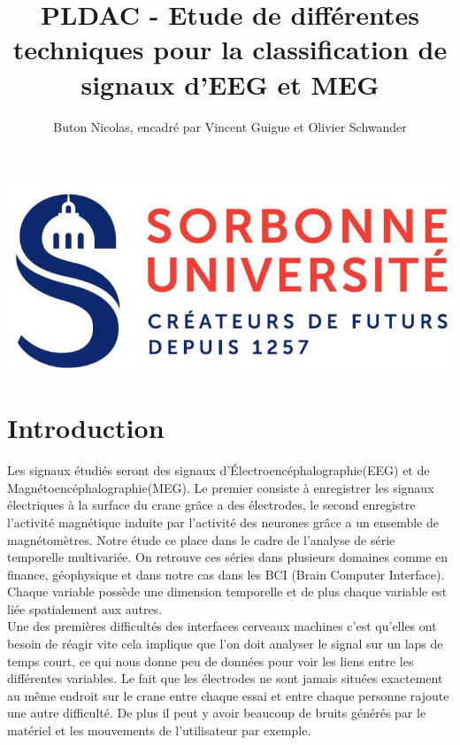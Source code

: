 \documentclass{article}[12pt]
\title{PLDAC - Etude de différentes techniques pour la classification de signaux d'EEG et MEG}
\author{Buton Nicolas, encadré par Vincent Guigue et Olivier Schwander}
\begin{document}
\maketitle
\begin{center}
\includegraphics[scale=1]{images/logoSorbonne.jpg}
\end{center}
\newpage
\tableofcontents
\newpage
{}
\part{Introduction}
Les signaux étudiés seront des signaux d'Électroencéphalographie(EEG) et de Magnétoencéphalographie(MEG). Le premier consiste à enregistrer les signaux électriques à la surface du crane grâce a des électrodes, le second enregistre l'activité magnétique induite par l'activité des neurones grâce a un ensemble de magnétomètres. Notre étude ce place dans le cadre de l'analyse de série temporelle multivariée. On retrouve ces séries dans plusieurs domaines comme en finance, géophysique et dans notre cas dans les BCI (Brain Computer Interface). Chaque variable possède une dimension temporelle et de plus chaque variable est liée spatialement aux autres.\\

Une des premières difficultés des interfaces cerveaux machines c'est qu'elles ont besoin de réagir vite cela implique que l'on doit analyser le signal sur un laps de temps court, ce qui nous donne peu de données pour voir les liens entre les différentes variables. Le fait que les électrodes ne sont jamais situées exactement au même endroit sur le crane entre chaque essai et entre chaque personne rajoute une autre difficulté. De plus il peut y avoir beaucoup de bruits générés par le matériel et les mouvements de l'utilisateur par exemple.\\
\end{document}
